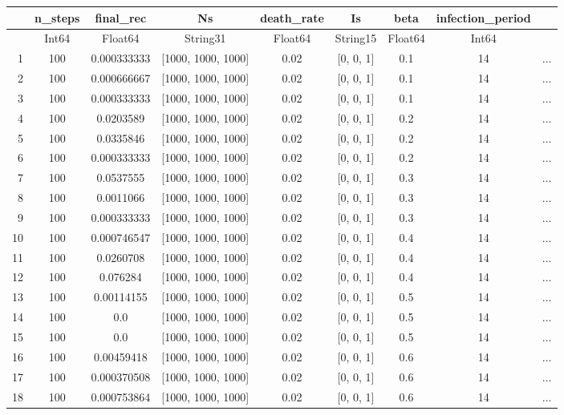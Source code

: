 \documentclass[
  12pt,
  a4paper,
  DIV=11,
  numbers=noendperiod]{scrreprt}
\begin{document}
\begin{tabular}{r|cccccccc}
    & n\_steps & final\_rec & Ns & death\_rate & Is & beta & infection\_period & \\
    \hline
    & Int64 & Float64 & String31 & Float64 & String15 & Float64 & Int64 & \\
    \hline
    1 & 100 & 0.000333333 & [1000, 1000, 1000] & 0.02 & [0, 0, 1] & 0.1 & 14 & $\dots$ \\
    2 & 100 & 0.000666667 & [1000, 1000, 1000] & 0.02 & [0, 0, 1] & 0.1 & 14 & $\dots$ \\
    3 & 100 & 0.000333333 & [1000, 1000, 1000] & 0.02 & [0, 0, 1] & 0.1 & 14 & $\dots$ \\
    4 & 100 & 0.0203589 & [1000, 1000, 1000] & 0.02 & [0, 0, 1] & 0.2 & 14 & $\dots$ \\
    5 & 100 & 0.0335846 & [1000, 1000, 1000] & 0.02 & [0, 0, 1] & 0.2 & 14 & $\dots$ \\
    6 & 100 & 0.000333333 & [1000, 1000, 1000] & 0.02 & [0, 0, 1] & 0.2 & 14 & $\dots$ \\
    7 & 100 & 0.0537555 & [1000, 1000, 1000] & 0.02 & [0, 0, 1] & 0.3 & 14 & $\dots$ \\
    8 & 100 & 0.0011066 & [1000, 1000, 1000] & 0.02 & [0, 0, 1] & 0.3 & 14 & $\dots$ \\
    9 & 100 & 0.000333333 & [1000, 1000, 1000] & 0.02 & [0, 0, 1] & 0.3 & 14 & $\dots$ \\
    10 & 100 & 0.000746547 & [1000, 1000, 1000] & 0.02 & [0, 0, 1] & 0.4 & 14 & $\dots$ \\
    11 & 100 & 0.0260708 & [1000, 1000, 1000] & 0.02 & [0, 0, 1] & 0.4 & 14 & $\dots$ \\
    12 & 100 & 0.076284 & [1000, 1000, 1000] & 0.02 & [0, 0, 1] & 0.4 & 14 & $\dots$ \\
    13 & 100 & 0.00114155 & [1000, 1000, 1000] & 0.02 & [0, 0, 1] & 0.5 & 14 & $\dots$ \\
    14 & 100 & 0.0 & [1000, 1000, 1000] & 0.02 & [0, 0, 1] & 0.5 & 14 & $\dots$ \\
    15 & 100 & 0.0 & [1000, 1000, 1000] & 0.02 & [0, 0, 1] & 0.5 & 14 & $\dots$ \\
    16 & 100 & 0.00459418 & [1000, 1000, 1000] & 0.02 & [0, 0, 1] & 0.6 & 14 & $\dots$ \\
    17 & 100 & 0.000370508 & [1000, 1000, 1000] & 0.02 & [0, 0, 1] & 0.6 & 14 & $\dots$ \\
    18 & 100 & 0.000753864 & [1000, 1000, 1000] & 0.02 & [0, 0, 1] & 0.6 & 14 & $\dots$ \\

\end{tabular}
\end{document}
